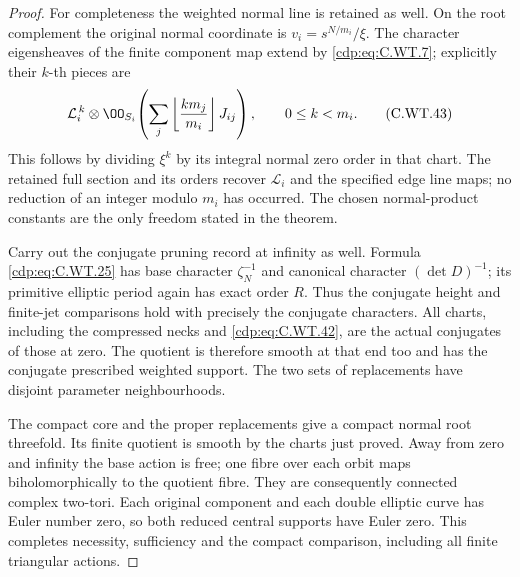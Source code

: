 \begin{proof}
For completeness the weighted
normal line is retained as
well. On the root complement
the original normal coordinate
is \(v_i=s^{N/m_i}/\xi\).
The character eigensheaves
of the finite component map
extend by \eqref{cdp:eq:C.WT.7}; explicitly
their \(k\)-th pieces are
\[
 \mathcal L_i^{\,k}\otimes
  \OO_{S_i}\!\left(
       \sum_j\left\lfloor\frac{k m_j}{m_i}\right\rfloor J_{ij}
             \right),\qquad 0\le k<m_i .
 \tag{C.WT.43}\label{cdp:eq:C.WT.43}
\]
This follows by dividing
\(\xi^k\) by its integral
normal zero order in that
chart. The retained full
section and its orders
recover \(\mathcal L_i\)
and the specified edge line
maps; no reduction of an
integer modulo \(m_i\)
has occurred. The chosen
normal-product constants
are the only freedom stated
in the theorem.

Carry out the conjugate
pruning record at infinity
as well. Formula \eqref{cdp:eq:C.WT.25}
has base character
\(\zeta_N^{-1}\) and canonical
character \((\det D)^{-1}\);
its primitive elliptic period
again has exact order \(R\).
Thus the conjugate height
and finite-jet comparisons
hold with precisely the
conjugate characters.
All charts, including the
compressed necks and
\eqref{cdp:eq:C.WT.42}, are the actual
conjugates of those at zero.
The quotient is therefore
smooth at that end too and
has the conjugate prescribed
weighted support. The two
sets of replacements have
disjoint parameter
neighbourhoods.

The compact core and the
proper replacements give
a compact normal root
threefold. Its finite
quotient is smooth by the
charts just proved. Away
from zero and infinity
the base action is free;
one fibre over each orbit
maps biholomorphically to
the quotient fibre. They
are consequently connected
complex two-tori. Each
original component and
each double elliptic curve
has Euler number zero,
so both reduced central
supports have Euler zero.
This completes necessity,
sufficiency and the compact
comparison, including all
finite triangular actions.
\end{proof}



